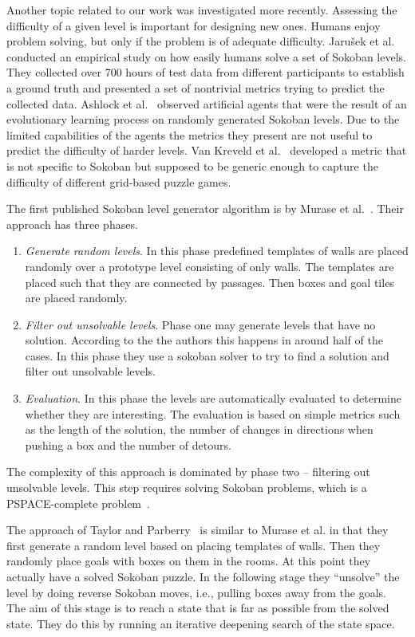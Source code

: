 \documentclass[runningheads]{llncs}
\begin{document}
Another topic related to our work was investigated more recently. Assessing the
difficulty of a given level is important for designing new ones.
Humans enjoy problem solving, but only if the problem is of adequate difficulty.
Jaru{\v s}ek et al.~\cite{jaruvsek2010human}
conducted an empirical study on how easily humans solve a set of Sokoban levels. They collected over 700 hours of test data from different participants to establish a ground truth and presented a set of nontrivial metrics trying to predict the collected data.
Ashlock et al.~\cite{ashlockEvolutionAutomaticAssessment2010}
observed artificial agents that were the result of an evolutionary learning process on randomly generated Sokoban levels. Due to the limited capabilities of the agents the metrics they present are not useful to predict the difficulty of harder levels.
Van Kreveld et al.~\cite{vankreveldAutomatedPuzzleDifficulty2015}
developed a metric that is not specific to Sokoban but supposed to be generic enough to capture the difficulty of different grid-based puzzle games.

The first published Sokoban level generator algorithm is by Murase et al.~\cite{murase1996automatic}.
Their approach has three phases.
\begin{enumerate}
\item \emph{Generate random levels}. In this phase predefined templates of walls are placed randomly
over a prototype level consisting of only walls.
The templates are placed such that they are connected by passages.
Then boxes and goal tiles are placed randomly.
\item \emph{Filter out unsolvable levels}. Phase one may generate levels that have no solution. According to the the authors this happens in around half of the cases. In this phase they use a sokoban solver to try to find a solution and filter out unsolvable levels.
\item \emph{Evaluation}. In this phase the levels are automatically evaluated to determine whether
they are interesting. The evaluation is based on simple metrics such as the length of the solution, the number of changes in directions when pushing a box and the number of detours.
\end{enumerate}

The complexity of this approach is dominated by phase two -- filtering out unsolvable levels. This
step requires solving Sokoban problems, which is a PSPACE-complete problem~\cite{culberson1997sokoban}.

The approach of Taylor and Parberry~\cite{taylor2011procedural} is similar to Murase et al.
in that they first generate a random level based on placing templates of walls. Then they
randomly place goals with boxes on them in the rooms. At this point they
actually have a solved Sokoban
puzzle. In the following stage they ``unsolve'' the level by doing reverse Sokoban moves, i.e.,
pulling boxes away from the goals. The aim of this stage is to reach a state that is far as
possible from the solved state. They do this by running an iterative deepening search of the
state space.
\end{document}
